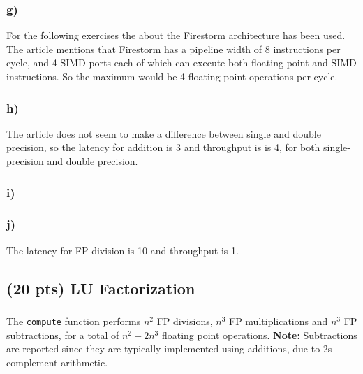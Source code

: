 \documentclass[tikz,14pt,fleqn]{article}
\begin{document}
\subsubsection*{g)}
For the following exercises the  about the Firestorm architecture has been used. The article mentions that Firestorm has a pipeline width of 8 instructions per cycle, and 4 SIMD ports each of which can execute both floating-point and SIMD instructions. So the maximum would be 4 floating-point operations per cycle.
\subsubsection*{h)}
The article does not seem to make a difference between single and double precision, so the latency for addition is 3 and throughput is is 4, for both single-precision and double precision.
\subsubsection*{i)}

\subsubsection*{j)}
The latency for FP division is 10 and throughput is 1.


\subsection{(20 pts) LU Factorization}
\subsubsection{} %

\subsubsection{} %
The \texttt{compute} function performs $n^2$ FP divisions, $n^3$ FP multiplications and $n^3$ FP subtractions, for a total of $n^2 + 2n^3$ floating point operations. \textbf{Note:} Subtractions are reported since they are typically implemented using additions, due to 2s complement arithmetic.
\end{document}
